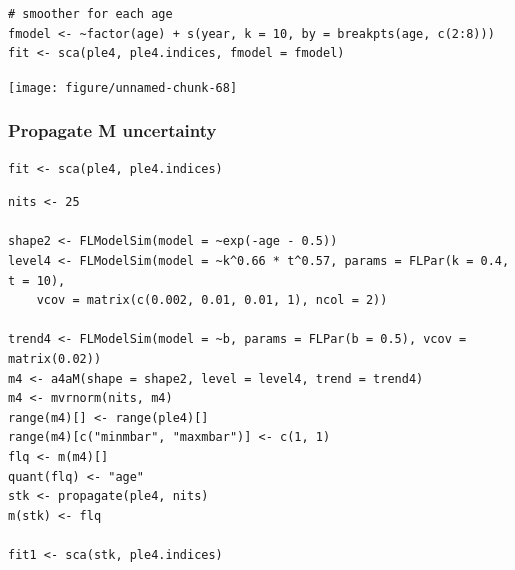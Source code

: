 \documentclass[a4paper,english,10pt]{article}\usepackage[]{graphicx}\usepackage[]{color}
\makeatletter
\newenvironment{kframe}{%
 \def\at@end@of@kframe{}%
 \ifinner\ifhmode%
  \def\at@end@of@kframe{\end{minipage}}%
  \begin{minipage}{\columnwidth}%
 \fi\fi%
 \def\FrameCommand##1{\hskip\@totalleftmargin \hskip-\fboxsep
 \colorbox{shadecolor}{##1}\hskip-\fboxsep
     \hskip-\linewidth \hskip-\@totalleftmargin \hskip\columnwidth}%
 \MakeFramed {\advance\hsize-\width
   \@totalleftmargin\z@ \linewidth\hsize
   \@setminipage}}%
 {\par\unskip\endMakeFramed%
 \at@end@of@kframe}
\newenvironment{knitrout}{}{} %
\makeatother
\begin{document}
\begin{knitrout}
\color{fgcolor}\begin{kframe}
\begin{verbatim}
# smoother for each age
fmodel <- ~factor(age) + s(year, k = 10, by = breakpts(age, c(2:8)))
fit <- sca(ple4, ple4.indices, fmodel = fmodel)
\end{verbatim}
\end{kframe}
\end{knitrout}


\begin{knitrout}
\color{fgcolor}

{\centering \texttt{[image: figure/unnamed-chunk-68]} 

}



\end{knitrout}


\subsubsection{Propagate M uncertainty}


\begin{knitrout}
\color{fgcolor}\begin{kframe}
\begin{verbatim}
fit <- sca(ple4, ple4.indices)
\end{verbatim}
\end{kframe}
\end{knitrout}


\begin{knitrout}
\color{fgcolor}\begin{kframe}
\begin{verbatim}
nits <- 25

shape2 <- FLModelSim(model = ~exp(-age - 0.5))
level4 <- FLModelSim(model = ~k^0.66 * t^0.57, params = FLPar(k = 0.4, t = 10), 
    vcov = matrix(c(0.002, 0.01, 0.01, 1), ncol = 2))

trend4 <- FLModelSim(model = ~b, params = FLPar(b = 0.5), vcov = matrix(0.02))
m4 <- a4aM(shape = shape2, level = level4, trend = trend4)
m4 <- mvrnorm(nits, m4)
range(m4)[] <- range(ple4)[]
range(m4)[c("minmbar", "maxmbar")] <- c(1, 1)
flq <- m(m4)[]
quant(flq) <- "age"
stk <- propagate(ple4, nits)
m(stk) <- flq

fit1 <- sca(stk, ple4.indices)
\end{verbatim}
\end{kframe}
\end{knitrout}
\end{document}
